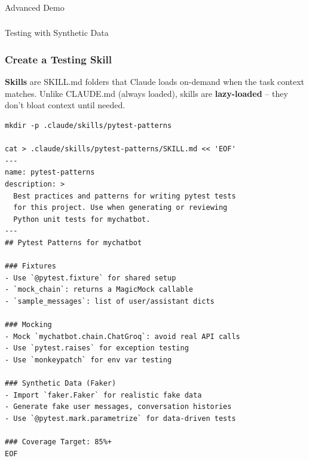 \begin{frame}[fragile]\frametitle{}
\begin{center}
{\Large Advanced Demo}
\end{center}
\end{frame}

\begin{frame}[fragile]\frametitle{}
\begin{center}
{\Large Testing with Synthetic Data}

\end{center}
\end{frame}


\begin{frame}[fragile]\frametitle{Create a Testing Skill}
\textbf{Skills} are SKILL.md folders that Claude loads on-demand when the task context matches. Unlike CLAUDE.md (always loaded), skills are \textbf{lazy-loaded} -- they don't bloat context until needed.

\begin{lstlisting}
mkdir -p .claude/skills/pytest-patterns

cat > .claude/skills/pytest-patterns/SKILL.md << 'EOF'
---
name: pytest-patterns
description: >
  Best practices and patterns for writing pytest tests
  for this project. Use when generating or reviewing
  Python unit tests for mychatbot.
---
## Pytest Patterns for mychatbot

### Fixtures
- Use `@pytest.fixture` for shared setup
- `mock_chain`: returns a MagicMock callable
- `sample_messages`: list of user/assistant dicts

### Mocking
- Mock `mychatbot.chain.ChatGroq`: avoid real API calls
- Use `pytest.raises` for exception testing
- Use `monkeypatch` for env var testing

### Synthetic Data (Faker)
- Import `faker.Faker` for realistic fake data
- Generate fake user messages, conversation histories
- Use `@pytest.mark.parametrize` for data-driven tests

### Coverage Target: 85%+
EOF
\end{lstlisting}
\end{frame}


